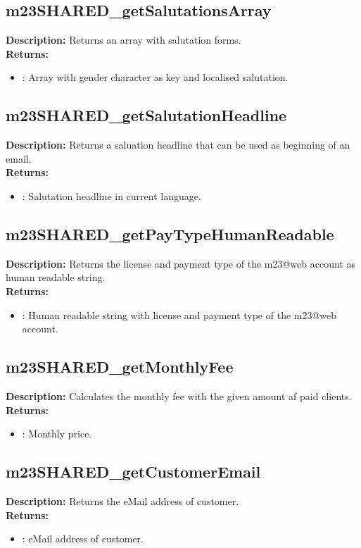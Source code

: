 \subsection{m23SHARED\_getSalutationsArray}
\textbf{Description:} Returns an array with salutation forms.\\
\textbf{Returns:}
\begin{itemize}
\item : Array with gender character as key and localised salutation.
\end{itemize}

\subsection{m23SHARED\_getSalutationHeadline}
\textbf{Description:} Returns a saluation headline that can be used as beginning of an email.\\
\textbf{Returns:}
\begin{itemize}
\item : Salutation headline in current language.
\end{itemize}

\subsection{m23SHARED\_getPayTypeHumanReadable}
\textbf{Description:} Returns the license and payment type of the m23@web account as human readable string.\\
\textbf{Returns:}
\begin{itemize}
\item : Human readable string with license and payment type of the m23@web account.
\end{itemize}

\subsection{m23SHARED\_getMonthlyFee}
\textbf{Description:} Calculates the monthly fee with the given amount af paid clients.\\
\textbf{Returns:}
\begin{itemize}
\item : Monthly price.
\end{itemize}

\subsection{m23SHARED\_getCustomerEmail}
\textbf{Description:} Returns the eMail address of customer.\\
\textbf{Returns:}
\begin{itemize}
\item : eMail address of customer.
\end{itemize}


